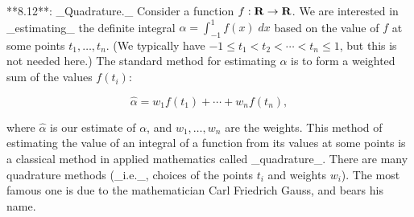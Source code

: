 

**8.12**: _Quadrature._ Consider a function \(f:{\bf R}\to{\bf R}\). We are interested in _estimating_ the definite integral \(\alpha=\int_{-1}^{1}f(x)\;dx\) based on the value of \(f\) at some points \(t_{1},\ldots,t_{n}\). (We typically have \(-1\leq t_{1}<t_{2}<\cdots<t_{n}\leq 1\), but this is not needed here.) The standard method for estimating \(\alpha\) is to form a weighted sum of the values \(f(t_{i})\):

\[\hat{\alpha}=w_{1}f(t_{1})+\cdots+w_{n}f(t_{n}),\]

where \(\hat{\alpha}\) is our estimate of \(\alpha\), and \(w_{1},\ldots,w_{n}\) are the weights. This method of estimating the value of an integral of a function from its values at some points is a classical method in applied mathematics called _quadrature_. There are many quadrature methods (_i.e._, choices of the points \(t_{i}\) and weights \(w_{i}\)). The most famous one is due to the mathematician Carl Friedrich Gauss, and bears his name.

